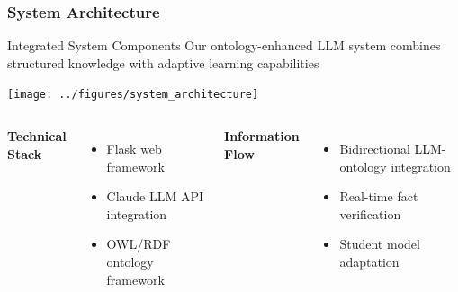 \documentclass{beamer}
\begin{document}
\begin{frame}
\frametitle{System Architecture}

\begin{block}{Integrated System Components}
Our ontology-enhanced LLM system combines structured knowledge with adaptive learning capabilities
\end{block}

\begin{center}
\texttt{[image: ../figures/system\_architecture]}
\end{center}

\begin{columns}

\textbf{Technical Stack}
\begin{itemize}
    \item Flask web framework 
    \item Claude LLM API integration
    \item OWL/RDF ontology framework
\end{itemize}

\textbf{Information Flow}
\begin{itemize}
    \item Bidirectional LLM-ontology integration
    \item Real-time fact verification
    \item Student model adaptation
\end{itemize}

\end{columns}
\end{frame}
\end{document}
